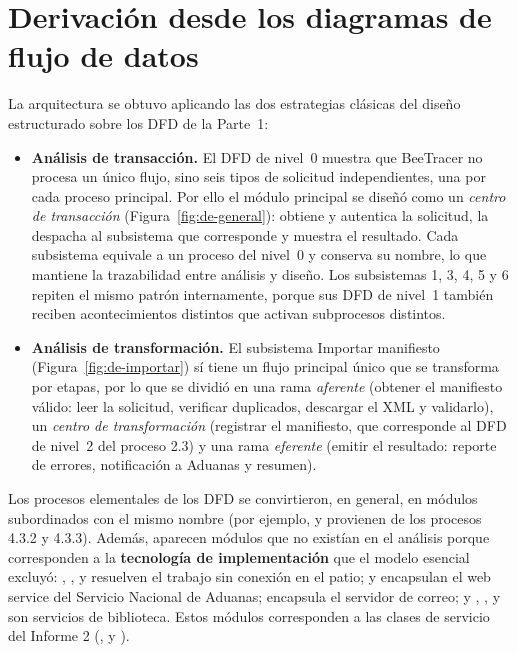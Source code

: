 \section{Derivación desde los diagramas de flujo de datos}

La arquitectura se obtuvo aplicando las dos estrategias clásicas del diseño estructurado
sobre los DFD de la Parte~1:

\begin{itemize}
    \item \textbf{Análisis de transacción.} El DFD de nivel~0 muestra que BeeTracer no procesa
    un único flujo, sino seis tipos de solicitud independientes, una por cada proceso
    principal. Por ello el módulo principal se diseñó como un \emph{centro de transacción}
    (Figura~\ref{fig:de-general}): obtiene y autentica la solicitud, la despacha al subsistema
    que corresponde y muestra el resultado. Cada subsistema equivale a un proceso del nivel~0
    y conserva su nombre, lo que mantiene la trazabilidad entre análisis y diseño. Los
    subsistemas 1, 3, 4, 5 y 6 repiten el mismo patrón internamente, porque sus DFD de
    nivel~1 también reciben acontecimientos distintos que activan subprocesos distintos.
    \item \textbf{Análisis de transformación.} El subsistema Importar manifiesto
    (Figura~\ref{fig:de-importar}) sí tiene un flujo principal único que se transforma por
    etapas, por lo que se dividió en una rama \emph{aferente} (obtener el manifiesto
    válido: leer la solicitud, verificar duplicados, descargar el XML y validarlo), un
    \emph{centro de transformación} (registrar el manifiesto, que corresponde al DFD de
    nivel~2 del proceso 2.3) y una rama \emph{eferente} (emitir el resultado: reporte de
    errores, notificación a Aduanas y resumen).
\end{itemize}

Los procesos elementales de los DFD se convirtieron, en general, en módulos subordinados con
el mismo nombre (por ejemplo,  y  provienen
de los procesos 4.3.2 y 4.3.3). Además, aparecen módulos que no existían en el análisis
porque corresponden a la \textbf{tecnología de implementación} que el modelo esencial
excluyó: , ,
 y  resuelven el trabajo sin conexión en
el patio;  y  encapsulan el web
service del Servicio Nacional de Aduanas;  encapsula el servidor de
correo; y , ,  y
 son servicios de biblioteca. Estos módulos corresponden a
las clases de servicio del Informe 2 (,  y
).


